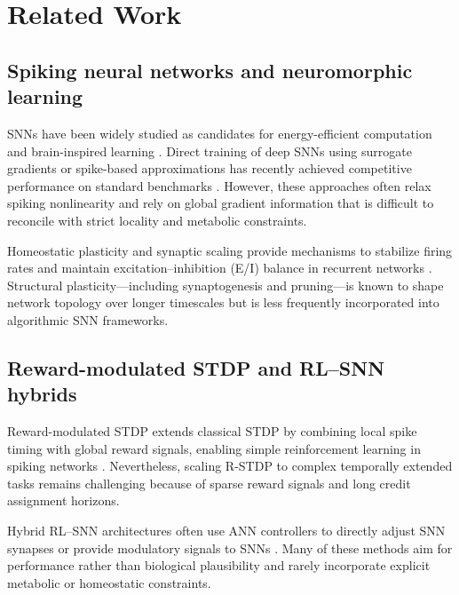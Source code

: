 \documentclass[journal,twocolumn]{IEEEtran}
\begin{document}
\section{Related Work}\label{sec:related}

\subsection{Spiking neural networks and neuromorphic learning}

SNNs have been widely studied as candidates for energy-efficient
computation and brain-inspired learning
\cite{Izhikevich2003simple,NeuromorphicSNNMemristor2019,%
NeuromorphicReview2019,Davies2024Loihi}.  Direct training of deep
SNNs using surrogate gradients or spike-based approximations has
recently achieved competitive performance on standard benchmarks
\cite{RecentFrontiersSNN2022,DirectTrainingSNN2024}.  However, these
approaches often relax spiking nonlinearity and rely on global
gradient information that is difficult to reconcile with strict
locality and metabolic constraints.

Homeostatic plasticity and synaptic scaling provide mechanisms to
stabilize firing rates and maintain excitation--inhibition (E/I)
balance in recurrent networks
\cite{Turrigiano2008SelfTuning,HomeostaticSTDP2010,eLifeHomeostatic2025}.
Structural plasticity---including synaptogenesis and pruning---is
known to shape network topology over longer timescales but is less
frequently incorporated into algorithmic SNN frameworks.

\subsection{Reward-modulated STDP and RL--SNN hybrids}

Reward-modulated STDP extends classical STDP by combining local spike
timing with global reward signals, enabling simple reinforcement
learning in spiking networks \cite{Florian2007rstdp,FarriesFairhall2007}.
Nevertheless, scaling R-STDP to complex temporally extended tasks
remains challenging because of sparse reward signals and long credit
assignment horizons.

Hybrid RL--SNN architectures often use ANN controllers to directly
adjust SNN synapses or provide modulatory signals to SNNs
\cite{AcetylcholineNav2018,Bellec2018l2l,Zheng2024SNNRL}.  Many of
these methods aim for performance rather than biological plausibility
and rarely incorporate explicit metabolic or homeostatic constraints.
\end{document}
